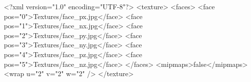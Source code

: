 <?xml version="1.0" encoding="UTF-8"?>
<texture>
    <faces>
        <face pos="0">Textures/face_px.jpg</face>
        <face pos="1">Textures/face_nx.jpg</face>
        <face pos="2">Textures/face_py.jpg</face>
        <face pos="3">Textures/face_ny.jpg</face>
        <face pos="4">Textures/face_pz.jpg</face>
        <face pos="5">Textures/face_nz.jpg</face>
    </faces>
    <mipmaps>false</mipmaps>
    <wrap u="2" v="2" w="2" />
</texture>